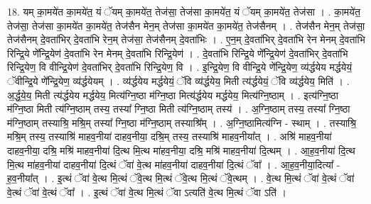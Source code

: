 \documentclass[17pt]{extarticle}
\begin{document}
18. यम् का॒मये॑त का॒मये॑त॒ यं ॅयम् का॒मये॑त॒ तेज॑सा॒ तेज॑सा का॒मये॑त॒ यं ॅयम् का॒मये॑त॒ तेज॑सा । . का॒मये॑त॒ तेज॑सा॒ तेज॑सा का॒मये॑त का॒मये॑त॒ तेज॑सैन मेन॒म् तेज॑सा का॒मये॑त का॒मये॑त॒ तेज॑सैनम् । . तेज॑सैन मेन॒म् तेज॑सा॒ तेज॑सैनम् दे॒वता॑भिर् दे॒वता॑भि रेन॒म् तेज॑सा॒ तेज॑सैनम् दे॒वता॑भिः । . ए॒न॒म् दे॒वता॑भिर् दे॒वता॑भि रेन मेनम् दे॒वता॑भि रिन्द्रि॒ये णे᳚न्द्रि॒येण॑ दे॒वता॑भि रेन मेनम् दे॒वता॑भि रिन्द्रि॒येण॑ । . दे॒वता॑भि रिन्द्रि॒ये णे᳚न्द्रि॒येण॑ दे॒वता॑भिर् दे॒वता॑भि रिन्द्रि॒येण॒ वि वीन्द्रि॒येण॑ दे॒वता॑भिर् दे॒वता॑भि रिन्द्रि॒येण॒ वि । . इ॒न्द्रि॒येण॒ वि वीन्द्रि॒ये णे᳚न्द्रि॒येण॒ व्य॑र्द्धयेय मर्द्धयेयं॒ ॅवीन्द्रि॒ये णे᳚न्द्रि॒येण॒ व्य॑र्द्धयेयम् । . व्य॑र्द्धयेय मर्द्धयेयं॒ ॅवि व्य॑र्द्धयेय॒ मिती त्य॑र्द्धयेयं॒ ॅवि व्य॑र्द्धयेय॒ मिति॑ । . अ॒र्द्ध॒ये॒य॒ मिती त्य॑र्द्धयेय मर्द्धयेय॒ मित्य॑ग्नि॒ष्ठा म॑ग्नि॒ष्ठा मित्य॑र्द्धयेय मर्द्धयेय॒ मित्य॑ग्नि॒ष्ठाम् । . इत्य॑ग्नि॒ष्ठा म॑ग्नि॒ष्ठा मिती त्य॑ग्नि॒ष्ठाम् तस्य॒ तस्या᳚ ग्नि॒ष्ठा मिती त्य॑ग्नि॒ष्ठाम् तस्य॑ । . अ॒ग्नि॒ष्ठाम् तस्य॒ तस्या᳚ ग्नि॒ष्ठा म॑ग्नि॒ष्ठाम् तस्याश्रि॒ मश्रि॒म् तस्या᳚ ग्नि॒ष्ठा म॑ग्नि॒ष्ठाम् तस्याश्रि᳚म् । . अ॒ग्नि॒ष्ठामित्य॑ग्नि - स्थाम् । . तस्याश्रि॒ मश्रि॒म् तस्य॒ तस्याश्रि॑ माहव॒नीया॑ दाहव॒नीया॒ दश्रि॒म् तस्य॒ तस्याश्रि॑ माहव॒नीया᳚त् । . अश्रि॑ माहव॒नीया॑ दाहव॒नीया॒ दश्रि॒ मश्रि॑ माहव॒नीया॑ दि॒त्थ मि॒त्थ मा॑हव॒नीया॒ दश्रि॒ मश्रि॑ माहव॒नीया॑ दि॒त्थम् । . आ॒ह॒व॒नीया॑ दि॒त्थ मि॒त्थ मा॑हव॒नीया॑ दाहव॒नीया॑ दि॒त्थं ॅवा॑ वे॒त्थ मा॑हव॒नीया॑ दाहव॒नीया॑ दि॒त्थं ॅवा᳚ । . आ॒ह॒व॒नीया॒दित्या᳚ - ह॒व॒नीया᳚त् । . इ॒त्थं ॅवा॑ वे॒त्थ मि॒त्थं ॅवे॒त्थ मि॒त्थं ॅवे॒त्थ मि॒त्थं ॅवे॒त्थम् । . वे॒त्थ मि॒त्थं ॅवा॑ वे॒त्थं ॅवा॑ वे॒त्थं ॅवा॑ वे॒त्थं ॅवा᳚ । . इ॒त्थं ॅवा॑ वे॒त्थ मि॒त्थं ॅवा ऽत्यति॑ वे॒त्थ मि॒त्थं ॅवा ऽति॑ । \newline
\end{document}
